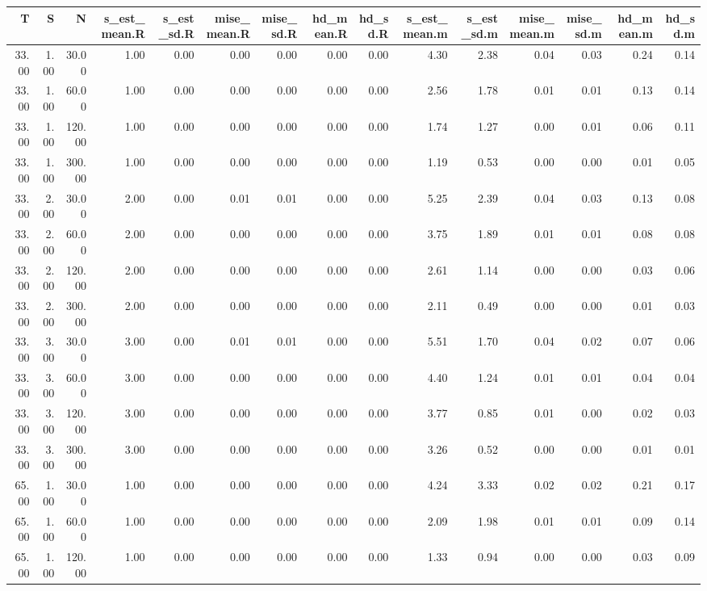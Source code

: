 \begin{table}[ht]
\centering
\begin{tabular}{rrrrrrrrrrrrrrr}
  \hline
T & S & N & s\_est\_mean.R & s\_est\_sd.R & mise\_mean.R & mise\_sd.R & hd\_mean.R & hd\_sd.R & s\_est\_mean.m & s\_est\_sd.m & mise\_mean.m & mise\_sd.m & hd\_mean.m & hd\_sd.m \\ 
  \hline
33.00 & 1.00 & 30.00 & 1.00 & 0.00 & 0.00 & 0.00 & 0.00 & 0.00 & 4.30 & 2.38 & 0.04 & 0.03 & 0.24 & 0.14 \\ 
  33.00 & 1.00 & 60.00 & 1.00 & 0.00 & 0.00 & 0.00 & 0.00 & 0.00 & 2.56 & 1.78 & 0.01 & 0.01 & 0.13 & 0.14 \\ 
  33.00 & 1.00 & 120.00 & 1.00 & 0.00 & 0.00 & 0.00 & 0.00 & 0.00 & 1.74 & 1.27 & 0.00 & 0.01 & 0.06 & 0.11 \\ 
  33.00 & 1.00 & 300.00 & 1.00 & 0.00 & 0.00 & 0.00 & 0.00 & 0.00 & 1.19 & 0.53 & 0.00 & 0.00 & 0.01 & 0.05 \\ 
  33.00 & 2.00 & 30.00 & 2.00 & 0.00 & 0.01 & 0.01 & 0.00 & 0.00 & 5.25 & 2.39 & 0.04 & 0.03 & 0.13 & 0.08 \\ 
  33.00 & 2.00 & 60.00 & 2.00 & 0.00 & 0.00 & 0.00 & 0.00 & 0.00 & 3.75 & 1.89 & 0.01 & 0.01 & 0.08 & 0.08 \\ 
  33.00 & 2.00 & 120.00 & 2.00 & 0.00 & 0.00 & 0.00 & 0.00 & 0.00 & 2.61 & 1.14 & 0.00 & 0.00 & 0.03 & 0.06 \\ 
  33.00 & 2.00 & 300.00 & 2.00 & 0.00 & 0.00 & 0.00 & 0.00 & 0.00 & 2.11 & 0.49 & 0.00 & 0.00 & 0.01 & 0.03 \\ 
  33.00 & 3.00 & 30.00 & 3.00 & 0.00 & 0.01 & 0.01 & 0.00 & 0.00 & 5.51 & 1.70 & 0.04 & 0.02 & 0.07 & 0.06 \\ 
  33.00 & 3.00 & 60.00 & 3.00 & 0.00 & 0.00 & 0.00 & 0.00 & 0.00 & 4.40 & 1.24 & 0.01 & 0.01 & 0.04 & 0.04 \\ 
  33.00 & 3.00 & 120.00 & 3.00 & 0.00 & 0.00 & 0.00 & 0.00 & 0.00 & 3.77 & 0.85 & 0.01 & 0.00 & 0.02 & 0.03 \\ 
  33.00 & 3.00 & 300.00 & 3.00 & 0.00 & 0.00 & 0.00 & 0.00 & 0.00 & 3.26 & 0.52 & 0.00 & 0.00 & 0.01 & 0.01 \\ 
  65.00 & 1.00 & 30.00 & 1.00 & 0.00 & 0.00 & 0.00 & 0.00 & 0.00 & 4.24 & 3.33 & 0.02 & 0.02 & 0.21 & 0.17 \\ 
  65.00 & 1.00 & 60.00 & 1.00 & 0.00 & 0.00 & 0.00 & 0.00 & 0.00 & 2.09 & 1.98 & 0.01 & 0.01 & 0.09 & 0.14 \\ 
  65.00 & 1.00 & 120.00 & 1.00 & 0.00 & 0.00 & 0.00 & 0.00 & 0.00 & 1.33 & 0.94 & 0.00 & 0.00 & 0.03 & 0.09 \\ 

\end{tabular}
\end{table}
